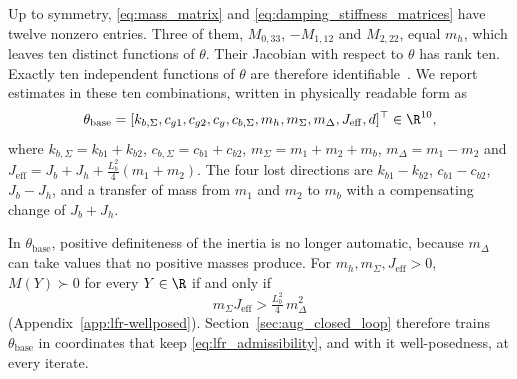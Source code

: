 Up to symmetry, \eqref{eq:mass_matrix} and \eqref{eq:damping_stiffness_matrices}
have twelve nonzero entries.
Three of them, $M_{0,33}$, $-M_{1,12}$ and $M_{2,22}$, equal $m_h$, which
leaves ten distinct functions of $\theta$.
Their Jacobian with respect to $\theta$ has rank ten.
Exactly ten independent functions of $\theta$ are therefore
identifiable~\cite[Def.~7]{ovchinnikov2021computing}.
We report estimates in these ten combinations, written in physically
readable form as
\begin{equation}
  \theta_{\mathrm{base}}=[k_{b,\Sigma},c_{g1},c_{g2},c_y,c_{b,\Sigma},
  m_h,m_\Sigma,m_\Delta,J_{\mathrm{eff}},d]^\top\in\R^{10},
  \label{eq:phi}
\end{equation}
where $k_{b,\Sigma}=k_{b1}+k_{b2}$, $c_{b,\Sigma}=c_{b1}+c_{b2}$,
$m_\Sigma=m_1+m_2+m_b$, $m_\Delta=m_1-m_2$ and
$J_{\mathrm{eff}}=J_b+J_h+\tfrac{L_b^2}{4}(m_1+m_2)$.
The four lost directions are $k_{b1}-k_{b2}$, $c_{b1}-c_{b2}$, $J_b-J_h$, and
a transfer of mass from $m_1$ and $m_2$ to $m_b$ with a compensating change
of $J_b+J_h$.

In $\theta_{\mathrm{base}}$, positive definiteness of the inertia is no longer
automatic, because $m_\Delta$ can take values that no positive masses
produce.
For $m_h,m_\Sigma,J_{\mathrm{eff}}>0$, $M(Y)\succ0$ for every $Y\in\R$ if
and only if
\begin{equation}
  m_\Sigma J_{\mathrm{eff}}>\tfrac{L_b^2}{4}\,m_\Delta^2
  \label{eq:lfr_admissibility}
\end{equation}
(Appendix~\ref{app:lfr-wellposed}).
Section~\ref{sec:aug_closed_loop} therefore trains $\theta_{\mathrm{base}}$
in coordinates that keep \eqref{eq:lfr_admissibility}, and with it
well-posedness, at every iterate.

